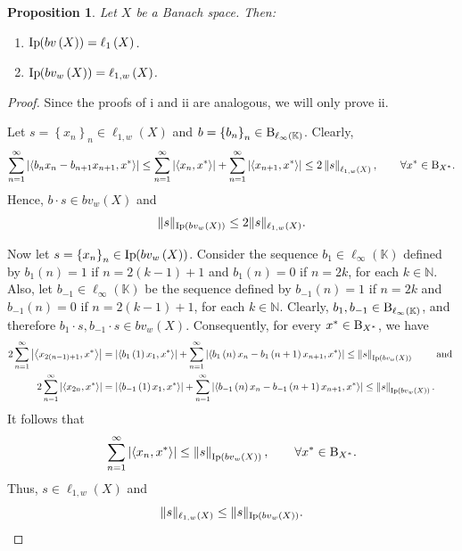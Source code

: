 \documentclass[14pt, a4paper]{article}  %
\providecommand{\llave}[1]{\left\lbrace #1\right\rbrace }
\providecommand{\pare}[1]{\left( #1\right) }
\providecommand{\norm}[1]{\left\lVert#1\right\rVert}
\providecommand{\abs}[1]{\left\lvert#1\right\rvert}
\providecommand{\Sum}[1]{\displaystyle\sum#1}
\newcommand{\K}{\mathbb{K}}
\newcommand{\N}{\mathbb{N}}
\newcommand{\B}{\textup{B}}
\newcommand{\la}{\left\langle}
\newcommand{\ra}{\right\rangle}
\newtheorem{proposition}{Proposition}[section]
\begin{document}
	\begin{proposition} 
		Let $X$ be a Banach space. Then:
		\begin{enumerate}
			\item[i.] $\textnormal{Ip}\hspace{-2pt}\pare{bv\pare{X}}=\ell_{1}\pare{X}$.
			\item[ii.] $\textnormal{Ip}\hspace{-2pt}\pare{bv_{w}\pare{X}}=\ell_{1,w}\pare{X}$.  
		\end{enumerate} 
	\end{proposition}
	\begin{proof} Since the proofs of i and ii are analogous, we will only prove ii.
		
  Let $s = \llave{x_{n}}_{n}\in \ell_{1,w}\pare{X}$ and $b=\llave{b_{n}}_{n}\in \B_{\ell_{\infty}\pare{\K}}$. Clearly,
\begin{equation}
	\Sum_{n=1}^{\infty}\abs{\la b_{n}x_{n}-b_{n+1}x_{n+1},x^{*}\ra}\leq \Sum_{n=1}^{\infty}\abs{\la x_{n},x^{*}\ra}+\Sum_{n=1}^{\infty}\abs{\la x_{n+1},x^{*}\ra}\leq 2 \norm{s}_{\ell_{1,w}\pare{X}},\qquad \forall x^{*}\in \B_{X^{*}}.
\end{equation}
Hence, $b\cdot s\in bv_{w}\pare{X}$ and
\begin{equation}
	\|s\|_{\textnormal{Ip}  \pare{bv_w (X)}} \leq 2 \|s\|_{\ell_{1,w} (X)}.
\end{equation}

Now let $s=\llave{x_{n}}_{n}\in \textnormal{Ip}\hspace{-2pt}\pare{bv_w\pare{X}}$. Consider the sequence $b_{1}\in \ell_{\infty}\pare{\K}$ defined by $b_{1}(n)=1$ if $n = 2(k-1)+1$ and $b_{1}(n)=0$ if $n = 2k$, for each $k\in \N$. Also, let $b_{-1}\in \ell_{\infty}\pare{\K}$ be the sequence defined by $b_{-1}(n)=1$ if $n = 2k$ and $b_{-1}(n)=0$ if $n = 2(k-1)+1$, for each $k\in \N$. Clearly, $b_{1},b_{-1}\in \B_{\ell_{\infty}\pare{\K}}$, and therefore $b_{1}\cdot s, b_{-1}\cdot s \in bv_w\pare{X}$. Consequently, for every $x^{*}\in \B_{X^{*}}$, we have
\begin{align*}
	2\Sum_{n=1}^{\infty}\abs{\la   x_{2\pare{n-1}+1},x^{*}\ra}&=\abs{\la b_{1}\pare{1}x_{1},x^{*}\ra}+ \Sum_{n=1}^{\infty}\abs{\la b_{1}\pare{n}x_{n}-b_{1}\pare{n+1}x_{n+1},x^{*}\ra}\leq \norm{s}_{\textnormal{Ip} \pare{bv_{w}\pare{X}}} \qquad \text{ and }\\
	2\Sum_{n=1}^{\infty}\abs{\la   x_{2n},x^{*}\ra} &=\abs{\la b_{-1}\pare{1}x_{1},x^{*}\ra}+ \Sum_{n=1}^{\infty}\abs{\la b_{-1}\pare{n}x_{n}-b_{-1}\pare{n+1}x_{n+1},x^{*}\ra}\leq \norm{s}_{\textnormal{Ip} \pare{bv_{w}\pare{X}}}.
\end{align*}
It follows that
\begin{equation}
	 \Sum_{n=1}^{\infty}\abs{\la   x_{n},x^{*}\ra}  \leq  \norm{s}_{\textnormal{Ip} \pare{bv_{w}\pare{X}}},\qquad \forall x^{*}\in \B_{X^{*}}.
\end{equation}
Thus, $s\in \ell_{1,w}\pare{X}$ and
\begin{equation}
	\|s\|_{\ell_{1,w} (X)}\leq	\|s\|_{\textnormal{Ip}  \pare{bv_w (X)}}.
\end{equation} 
	\end{proof}
\end{document}
